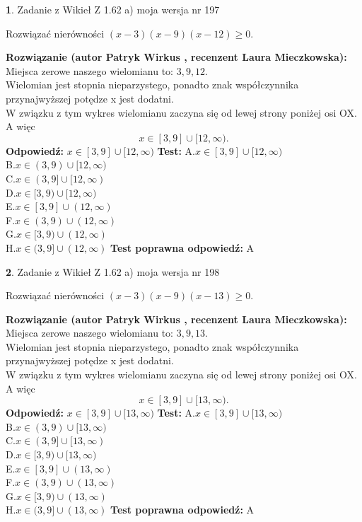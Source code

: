\documentclass[12pt, a4paper]{article}
\theoremstyle{definition} %
\newtheorem{zad}{}
\newcommand{\zadStart}[1]{\begin{zad}#1\newline}
\newcommand{\zadStop}{\end{zad}}
\newcommand{\rozwStart}[2]{\noindent \textbf{Rozwiązanie (autor #1 , recenzent #2): }\newline}
\newcommand{\rozwStop}{\newline}
\newcommand{\odpStart}{\noindent \textbf{Odpowiedź:}\newline}
\newcommand{\odpStop}{\newline}
\newcommand{\testStart}{\noindent \textbf{Test:}\newline}
\newcommand{\testStop}{\newline}
\newcommand{\kluczStart}{\noindent \textbf{Test poprawna odpowiedź:}\newline}
\newcommand{\kluczStop}{\newline}
\begin{document}
\zadStart{Zadanie z Wikieł Z 1.62 a) moja wersja nr 197}

Rozwiązać nierówności $(x-3)(x-9)(x-12)\ge0$.
\zadStop
\rozwStart{Patryk Wirkus}{Laura Mieczkowska}
Miejsca zerowe naszego wielomianu to: $3, 9, 12$.\\
Wielomian jest stopnia nieparzystego, ponadto znak współczynnika przy\linebreak najwyższej potędze x jest dodatni.\\ W związku z tym wykres wielomianu zaczyna się od lewej strony poniżej osi OX. A więc $$x \in [3,9] \cup [12,\infty).$$
\rozwStop
\odpStart
$x \in [3,9] \cup [12,\infty)$
\odpStop
\testStart
A.$x \in [3,9] \cup [12,\infty)$\\
B.$x \in (3,9) \cup [12,\infty)$\\
C.$x \in (3,9] \cup [12,\infty)$\\
D.$x \in [3,9) \cup [12,\infty)$\\
E.$x \in [3,9] \cup (12,\infty)$\\
F.$x \in (3,9) \cup (12,\infty)$\\
G.$x \in [3,9) \cup (12,\infty)$\\
H.$x \in (3,9] \cup (12,\infty)$
\testStop
\kluczStart
A
\kluczStop



\zadStart{Zadanie z Wikieł Z 1.62 a) moja wersja nr 198}

Rozwiązać nierówności $(x-3)(x-9)(x-13)\ge0$.
\zadStop
\rozwStart{Patryk Wirkus}{Laura Mieczkowska}
Miejsca zerowe naszego wielomianu to: $3, 9, 13$.\\
Wielomian jest stopnia nieparzystego, ponadto znak współczynnika przy\linebreak najwyższej potędze x jest dodatni.\\ W związku z tym wykres wielomianu zaczyna się od lewej strony poniżej osi OX. A więc $$x \in [3,9] \cup [13,\infty).$$
\rozwStop
\odpStart
$x \in [3,9] \cup [13,\infty)$
\odpStop
\testStart
A.$x \in [3,9] \cup [13,\infty)$\\
B.$x \in (3,9) \cup [13,\infty)$\\
C.$x \in (3,9] \cup [13,\infty)$\\
D.$x \in [3,9) \cup [13,\infty)$\\
E.$x \in [3,9] \cup (13,\infty)$\\
F.$x \in (3,9) \cup (13,\infty)$\\
G.$x \in [3,9) \cup (13,\infty)$\\
H.$x \in (3,9] \cup (13,\infty)$
\testStop
\kluczStart
A
\kluczStop
\end{document}

